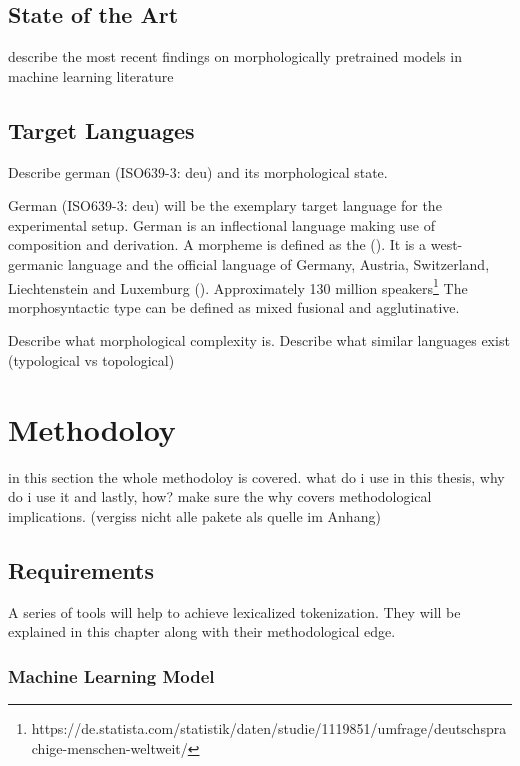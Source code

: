 \documentclass[english]{ttlab-qualify}
\begin{document}
    \section{State of the Art}
    \label{sec:state-of-the-art}
    describe the most recent findings on morphologically pretrained models in machine learning literature

    \section{Target Languages}
    \label{sec:target-languages}
    Describe german (ISO639-3: deu) and its morphological state.

    German (ISO639-3: deu) will be the exemplary target language for the experimental setup.
    German is an inflectional language making use of composition and derivation.
    A morpheme is defined as the  (\cite{morpheme}).
    It is a west-germanic language and the official language of Germany, Austria, Switzerland, Liechtenstein and Luxemburg (\cite{METZLER2016}).
    Approximately 130 million speakers\footnote{https://de.statista.com/statistik/daten/studie/1119851/umfrage/deutschsprachige-menschen-weltweit/}
    The morphosyntactic type can be defined as mixed fusional and agglutinative.


    Describe what morphological complexity is.
    Describe what similar languages exist (typological vs topological)

    \chapter{Methodoloy}
    \label{ch:methodology}
    in this section the whole methodoloy is covered. what do i use in this thesis, why do i use it and lastly, how?
    make sure the why covers methodological implications. (vergiss nicht alle pakete als quelle im Anhang)

    \section{Requirements}
    \label{sec:requirements}
    A series of tools will help to achieve lexicalized tokenization.
    They will be explained in this chapter along with their methodological edge.

    \subsection{Machine Learning Model}
    \label{subsec:mlm}
\end{document}
